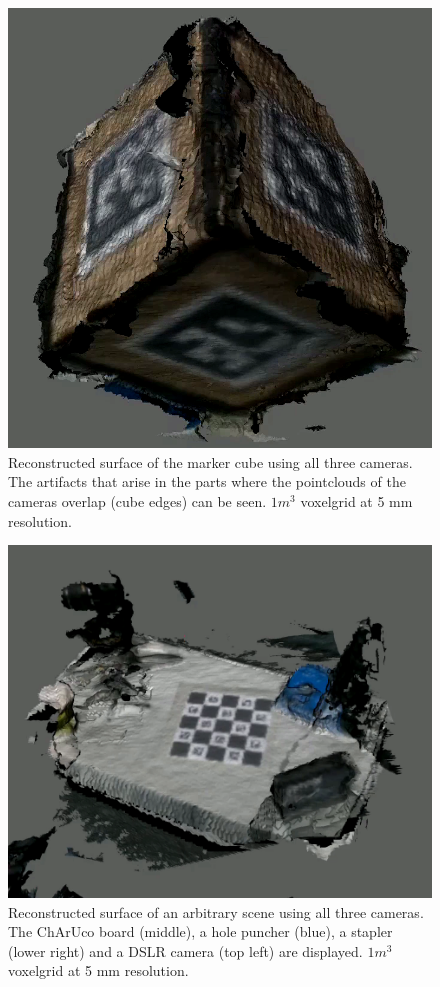 \documentclass[10pt,twocolumn,letterpaper]{article}
\begin{document}
\begin{figure}[h!]
	\begin{center}
		\includegraphics[width=0.9\linewidth]{imgs/cube_reconstructed.png}
	\end{center}
	\caption{Reconstructed surface of the marker cube using all three cameras. The artifacts that arise in the parts where the pointclouds of the cameras overlap (cube edges) can be seen. $1m^3$ voxelgrid at 5 mm resolution.}
	\label{fig:scene-1}
\end{figure}

\begin{figure}[h!]
	\begin{center}
		\includegraphics[width=0.9\linewidth]{imgs/scene.png}
	\end{center}
	\caption{Reconstructed surface of an arbitrary scene using all three cameras. The ChArUco board (middle), a hole puncher (blue), a stapler (lower right) and a DSLR camera (top left) are displayed. $1m^3$ voxelgrid at 5 mm resolution.}
	\label{fig:scene-2}
\end{figure}
\end{document}
